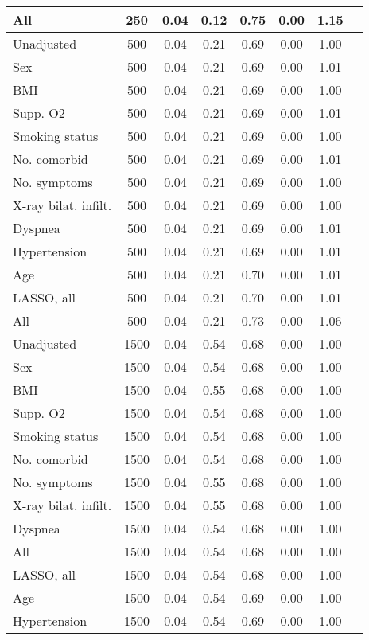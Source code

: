 \documentclass{article}
\begin{document}
{\begin{longtable}{lccccccc}
All & 250 & 0.04 & 0.12 & 0.75 & 0.00 & 1.15 \\ \midrule 
Unadjusted & 500 & 0.04 & 0.21 & 0.69 & 0.00 & 1.00 \\ 
Sex & 500 & 0.04 & 0.21 & 0.69 & 0.00 & 1.01 \\ 
BMI & 500 & 0.04 & 0.21 & 0.69 & 0.00 & 1.00 \\ 
Supp. O2 & 500 & 0.04 & 0.21 & 0.69 & 0.00 & 1.01 \\ 
Smoking status & 500 & 0.04 & 0.21 & 0.69 & 0.00 & 1.00 \\ 
No. comorbid & 500 & 0.04 & 0.21 & 0.69 & 0.00 & 1.01 \\ 
No. symptoms & 500 & 0.04 & 0.21 & 0.69 & 0.00 & 1.00 \\ 
X-ray bilat. infilt. & 500 & 0.04 & 0.21 & 0.69 & 0.00 & 1.00 \\ 
Dyspnea & 500 & 0.04 & 0.21 & 0.69 & 0.00 & 1.01 \\ 
Hypertension & 500 & 0.04 & 0.21 & 0.69 & 0.00 & 1.01 \\ 
Age & 500 & 0.04 & 0.21 & 0.70 & 0.00 & 1.01 \\ 
LASSO, all & 500 & 0.04 & 0.21 & 0.70 & 0.00 & 1.01 \\ 
All & 500 & 0.04 & 0.21 & 0.73 & 0.00 & 1.06 \\ \midrule 
Unadjusted & 1500 & 0.04 & 0.54 & 0.68 & 0.00 & 1.00 \\ 
Sex & 1500 & 0.04 & 0.54 & 0.68 & 0.00 & 1.00 \\ 
BMI & 1500 & 0.04 & 0.55 & 0.68 & 0.00 & 1.00 \\ 
Supp. O2 & 1500 & 0.04 & 0.54 & 0.68 & 0.00 & 1.00 \\ 
Smoking status & 1500 & 0.04 & 0.54 & 0.68 & 0.00 & 1.00 \\ 
No. comorbid & 1500 & 0.04 & 0.54 & 0.68 & 0.00 & 1.00 \\ 
No. symptoms & 1500 & 0.04 & 0.55 & 0.68 & 0.00 & 1.00 \\ 
X-ray bilat. infilt. & 1500 & 0.04 & 0.55 & 0.68 & 0.00 & 1.00 \\ 
Dyspnea & 1500 & 0.04 & 0.54 & 0.68 & 0.00 & 1.00 \\ 
All & 1500 & 0.04 & 0.54 & 0.68 & 0.00 & 1.00 \\ 
LASSO, all & 1500 & 0.04 & 0.54 & 0.68 & 0.00 & 1.00 \\ 
Age & 1500 & 0.04 & 0.54 & 0.69 & 0.00 & 1.00 \\ 
Hypertension & 1500 & 0.04 & 0.54 & 0.69 & 0.00 & 1.00 \\
\bottomrule
\hline
\end{longtable}
}
\end{document}
